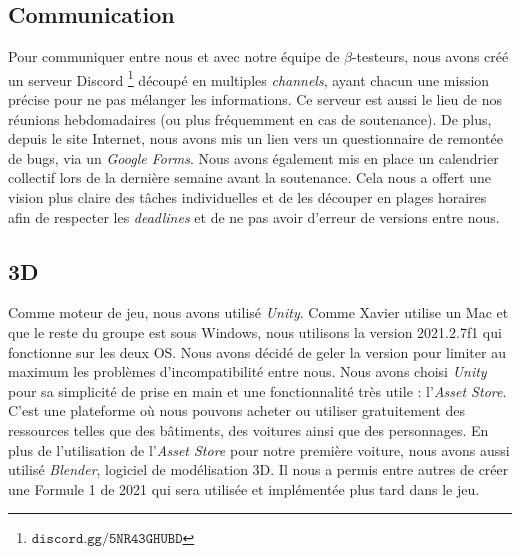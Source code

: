\documentclass[a4paper,12pt]{article}
\begin{document}
        \subsection{Communication}
            Pour communiquer entre nous et avec notre équipe de \(\beta\)-testeurs, nous
            avons créé un serveur Discord \footnote{\(\mathtt{discord.gg/5NR43GHUBD}\)}
            découpé en multiples 
            \textit{channels}, ayant chacun une mission précise pour ne pas mélanger les
            informations. Ce serveur est aussi le lieu de nos réunions hebdomadaires 
            (ou plus fréquemment en cas de soutenance). De plus, depuis le site Internet, nous
            avons mis un lien vers un questionnaire de remontée de bugs, via un \textsl{Google Forms}.
            Nous avons également mis en place un calendrier collectif lors de la
            dernière semaine avant la soutenance. Cela nous a offert une vision plus
            claire des tâches individuelles et de les découper en plages horaires afin de 
            respecter les \textit{deadlines} et de ne pas avoir d'erreur de versions
            entre nous.

            \clearpage
        \subsection{3D}
            Comme moteur de jeu, nous avons utilisé \textsl{Unity}. Comme Xavier utilise un Mac 
            et que le reste du groupe est sous Windows, nous utilisons la version 2021.2.7f1 qui
            fonctionne sur les deux OS. Nous avons décidé de geler la version pour limiter au
            maximum les problèmes d'incompatibilité entre nous. Nous avons choisi \textsl{Unity}
            pour sa simplicité de prise en main et une fonctionnalité très utile :
            l'\textsl{Asset Store}. C'est une plateforme où nous pouvons acheter ou
            utiliser gratuitement des ressources telles que des bâtiments, des voitures ainsi que
            des personnages. En plus de l'utilisation de l'\textsl{Asset Store} pour notre première
            voiture, nous avons aussi utilisé \textsl{Blender}, logiciel de modélisation 3D. Il
            nous a permis entre autres de créer une Formule 1 de 2021 qui sera utilisée et
            implémentée plus tard dans le jeu.
\end{document}
